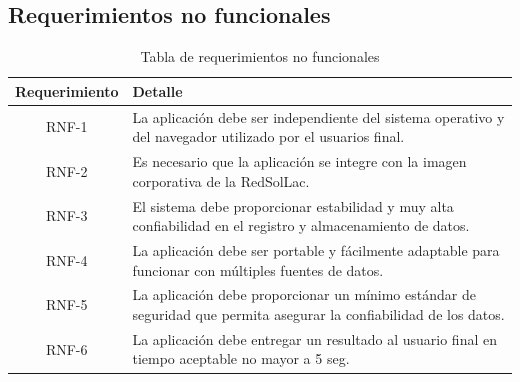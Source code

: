 \subsection{Requerimientos no funcionales}
\begin{table}[h!]
\caption{Tabla de requerimientos no funcionales}
\label{tablaNoFuncional}
\begin{tabular}{| c | p{11cm} |}
	\hline
	\textbf{Requerimiento}	&	\textbf{Detalle}	\\
	\hline
	RNF-1	&	La aplicación debe ser independiente del sistema operativo y del navegador utilizado por el usuarios final.\\
	\hline
	RNF-2	&	Es necesario que la aplicación se integre con la imagen corporativa de la RedSolLac.\\
	\hline
	RNF-3	&	El sistema debe proporcionar estabilidad y muy alta confiabilidad en el registro y almacenamiento de datos.\\
	\hline
	RNF-4	&	La aplicación debe ser portable y fácilmente adaptable para funcionar con múltiples fuentes de datos.\\
	\hline
	RNF-5	&	La aplicación debe proporcionar un mínimo estándar de seguridad que permita asegurar la confiabilidad de los datos.\\
	\hline
	RNF-6	&	La aplicación debe entregar un resultado al usuario final en tiempo aceptable no mayor a 5 seg.\\
	\hline
\end{tabular}
\end{table}


